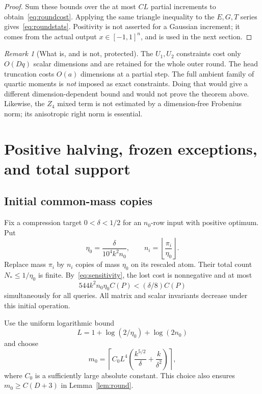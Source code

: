 \documentclass[11pt]{article}
\theoremstyle{remark}\newtheorem{remark}[theorem]{Remark}
\numberwithin{equation}{section}
\begin{document}
\begin{proof}
Sum these bounds over the at most $CL$ partial increments to obtain~\eqref{eq:roundcost}. Applying the same triangle inequality to the $E,G,T$ series gives~\eqref{eq:roundstats}. Positivity is not asserted for a Gaussian increment; it comes from the actual output $x\in[-1,1]^n$, and is used in the next section.
\end{proof}

\begin{remark}[What is, and is not, protected]
The $U_1,U_2$ constraints cost only $O(Dq)$ scalar dimensions and are retained for the whole outer round. The head truncation costs $O(a)$ dimensions at a partial step. The full ambient family of quartic moments is \emph{not} imposed as exact constraints. Doing that would give a different dimension-dependent bound and would not prove the theorem above. Likewise, the $Z_4$ mixed term is not estimated by a dimension-free Frobenius norm; its anisotropic right norm is essential.
\end{remark}

\section{Positive halving, frozen exceptions, and total support}\label{sec:upperend}
\subsection{Initial common-mass copies}
Fix a compression target $0<\delta<1/2$ for an $n_0$-row input with positive optimum. Put
\begin{equation}\label{eq:initialeta}
 \eta_0=\frac{\delta}{10^4 k^2n_0},\qquad
 n_i=\left\lfloor\frac{\pi_i}{\eta_0}\right\rfloor.
\end{equation}
Replace mass $\pi_i$ by $n_i$ copies of mass $\eta_0$ on its rescaled atom. Their total count $N_*\le1/\eta_0$ is finite. By~\eqref{eq:sensitivity}, the lost cost is nonnegative and at most
\begin{equation}\label{eq:initialerror}
 544k^2n_0\eta_0 C(P)<(\delta/8)C(P)
\end{equation}
simultaneously for all queries. All matrix and scalar invariants decrease under this initial operation.

Use the uniform logarithmic bound
\begin{equation}\label{eq:Lglobal}
 L=1+\log(2/\eta_0)+\log(2n_0)
\end{equation}
and choose
\begin{equation}\label{eq:m0choice}
 m_0=\left\lceil C_0L^4\left(\frac{k^{5/2}}\delta+\frac{k}{\delta^2}\right)\right\rceil,
\end{equation}
where $C_0$ is a sufficiently large absolute constant. This choice also ensures $m_0\ge C(D+3)$ in Lemma~\ref{lem:round}.
\end{document}
